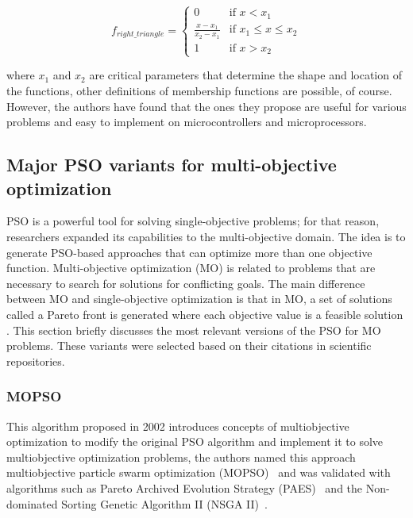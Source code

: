 \begin{equation}
    f_{right\_triangle} = \begin{cases}
    0 & \text{if $x < x_1$}\\
    \frac{x -x_1}{x_2 -x_1} & \text{if $x_1 \leq x \leq x_2$}\\
    1 & \text{if $x > x_2$}
    \end{cases}
\end{equation}

where $x_1$ and $x_2$ are critical parameters that determine the shape and location of the functions, other definitions of membership functions are possible, of course. However, the authors have found that the ones they propose are useful for various problems and easy to implement on microcontrollers and microprocessors.

\subsection{Major PSO variants for multi-objective optimization}
\label{sec:variants2}

PSO is a powerful tool for solving single-objective problems; for that reason, researchers expanded its capabilities to the multi-objective domain. The idea is to generate PSO-based approaches that can optimize more than one objective function. Multi-objective optimization (MO) is related to problems that are necessary to search for solutions for conflicting goals. The main difference between MO and single-objective optimization is that in MO, a set of solutions called a Pareto front is generated where each objective value is a feasible solution \cite{coello2007evolutionary}. This section briefly discusses the most relevant versions of the PSO for MO problems. These variants were selected based on their citations in scientific repositories.

\subsubsection{MOPSO} 

This algorithm proposed in 2002 introduces concepts of multiobjective optimization to modify the original PSO algorithm and implement it to solve multiobjective optimization problems, the authors named this approach multiobjective particle swarm optimization (MOPSO)~\cite{coello2002mopso} and was validated with algorithms such as Pareto Archived Evolution Strategy (PAES)~\cite{knowles1999pareto} and the Non-dominated Sorting Genetic Algorithm II (NSGA II)~\cite{deb2000fast}.

